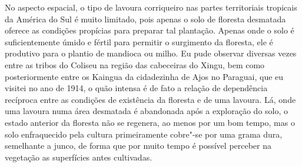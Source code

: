 No aspecto espacial, o tipo de lavoura corriqueiro nas partes
territoriais tropicais da América do Sul é muito limitado, pois apenas o
solo de floresta desmatada oferece as condições propícias para preparar
tal plantação. Apenas onde o solo é suficientemente úmido e fértil para
permitir o surgimento da floresta, ele é produtivo para o plantio de
mandioca ou milho. Eu pude observar diversas vezes entre as tribos do Coliseu
na região das cabeceiras do Xingu, bem como posteriormente entre os Kaingua da cidadezinha de 
Ajos no Paraguai, que eu visitei no ano de 1914, o quão intensa é de fato a relação de dependência
recíproca entre as condições de existência da floresta e de uma lavoura. 
Lá, onde uma lavoura numa área desmatada é abandonada após
a exploração do solo, o estado anterior da floresta não se regenera, ao
menos por um bom tempo, mas o solo enfraquecido pela cultura
primeiramente cobre"-se por uma grama dura, semelhante a junco, de forma
que por muito tempo é possível perceber na vegetação as superfícies
antes cultivadas.

